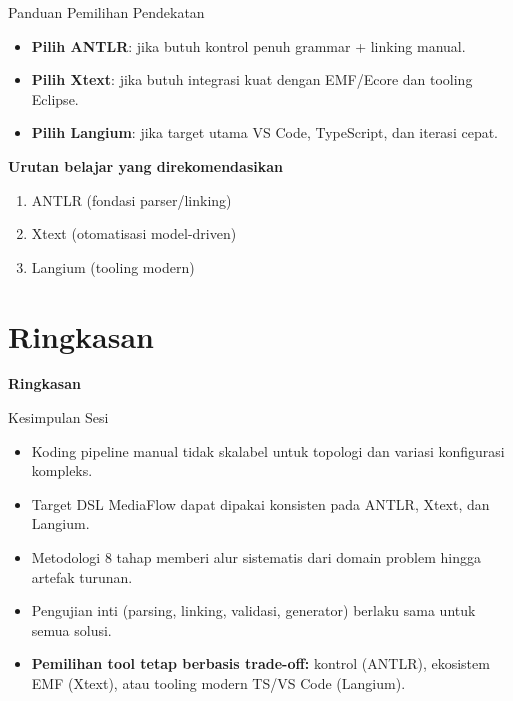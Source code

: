 \documentclass[aspectratio=169, table]{beamer}
\begin{document}
\begin{frame}{Panduan Pemilihan Pendekatan}
\vspace{4pt}
\begin{itemize}
  \item \textbf{Pilih ANTLR}: jika butuh kontrol penuh grammar + linking manual.
  \item \textbf{Pilih Xtext}: jika butuh integrasi kuat dengan EMF/Ecore dan tooling Eclipse.
  \item \textbf{Pilih Langium}: jika target utama VS Code, TypeScript, dan iterasi cepat.
\end{itemize}
\vspace{8pt}
\textbf{Urutan belajar yang direkomendasikan}
\begin{enumerate}
  \item ANTLR (fondasi parser/linking)
  \item Xtext (otomatisasi model-driven)
  \item Langium (tooling modern)
\end{enumerate}
\end{frame}

\section{Ringkasan}
\begin{frame}{\hfill}
	\centering
	\Huge{\textbf{Ringkasan}}
\end{frame}

\begin{frame}{Kesimpulan Sesi}
\small
\begin{itemize}
  \item Koding pipeline manual tidak skalabel untuk topologi dan variasi konfigurasi kompleks.
  \item Target DSL MediaFlow dapat dipakai konsisten pada ANTLR, Xtext, dan Langium.
  \item Metodologi 8 tahap memberi alur sistematis dari domain problem hingga artefak turunan.
  \item Pengujian inti (parsing, linking, validasi, generator) berlaku sama untuk semua solusi.
  \item \textbf{Pemilihan tool tetap berbasis trade-off:} kontrol (ANTLR), ekosistem EMF (Xtext), atau tooling modern TS/VS Code (Langium).
\end{itemize}
\end{frame}
\end{document}
